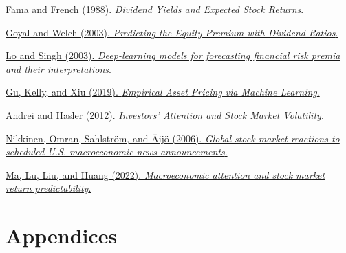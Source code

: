 \documentclass{article}
\begin{document}
\begin{thebibliography}{9}
\href{https://www.sciencedirect.com/science/article/pii/0304405X88900207}{Fama and French (1988). \emph{Dividend Yields and Expected Stock Returns}.}

\href{https://www.jstor.org/stable/4133989}{Goyal and Welch (2003). \emph{Predicting the Equity Premium with Dividend Ratios}.}

\href{https://www.tandfonline.com/doi/full/10.1080/14697688.2023.2203844}{Lo and Singh (2003). \emph{Deep-learning models for forecasting financial risk premia and their interpretations}.}

\href{https://dachxiu.chicagobooth.edu/download/ML.pdf}{Gu, Kelly, and Xiu (2019). \emph{Empirical Asset Pricing via Machine Learning}.}

\href{https://www.epfl.ch/labs/cfi/wp-content/uploads/2018/08/WP757_A2.pdf}{Andrei and Hasler (2012). \emph{Investors’ Attention and Stock Market Volatility}.}

\href{https://www.sciencedirect.com/science/article/pii/S104402830600024X}{Nikkinen, Omran, Sahlström, and Äijö (2006). \emph{Global stock market reactions to scheduled U.S. macroeconomic news announcements}.}

\href{https://doi.org/10.1016/j.intfin.2022.101603}{Ma, Lu, Liu, and Huang (2022). \emph{Macroeconomic attention and stock market return predictability}.}

\end{thebibliography}

\newpage

\section{Appendices}
\end{document}
